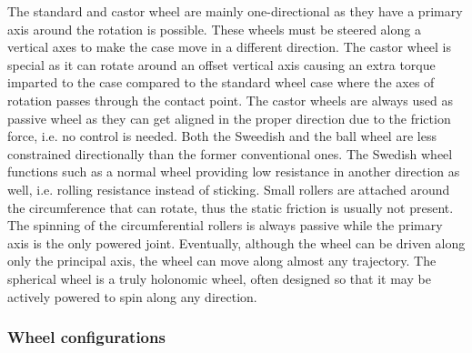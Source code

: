 \documentclass[12pt,english,twoside]{article}
\begin{document}
The standard and castor wheel are mainly one-directional as they have a primary axis around the rotation is possible. These wheels must be steered along a vertical axes to make the case move in a different direction. The castor wheel is special as it can rotate around an offset vertical axis causing an extra torque imparted to the case compared to the standard wheel case where the axes of rotation passes through the contact point. The castor wheels are always used as passive wheel as they can get aligned in the proper direction due to the friction force, i.e. no control is needed. 
Both the Sweedish and the ball wheel are less constrained directionally than the former conventional ones. The Swedish wheel functions such as a normal wheel providing low resistance in another direction as well, i.e. rolling resistance instead of sticking. Small rollers are attached around the circumference that can rotate, thus the static friction is usually not present. The spinning of the circumferential rollers is always passive while the primary axis is the only powered joint. Eventually, although the wheel can be driven along only the principal axis, the wheel can move along almost any trajectory. The spherical wheel is a truly holonomic wheel, often designed so that it may be actively powered to spin along any direction.

\subsubsection{Wheel configurations}
\end{document}
